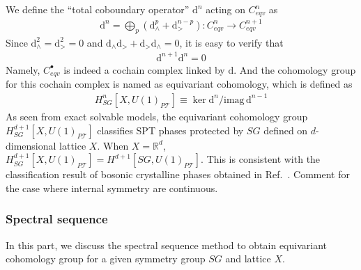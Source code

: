\documentclass[reprint,amsmath,amssymb,aps,pra,]{revtex4-1}
\newcommand{\dd}{\mathrm{d}} %
\newcommand{\TT}{\mathcal{T}} %
\newcommand{\imag}{\mathrm{imag}}
\begin{document}
We define the ``total coboundary operator'' $\dd^{n}$ acting on $C^{n}_{eqv}$ as
\begin{align}
  \dd^n=\bigoplus_p(\dd_\wedge^p+\dd_>^{n-p}):C^{n}_{eqv}\rightarrow C^{n+1}_{eqv}
  \label{}
\end{align}
Since $\dd_\wedge^2=\dd_>^2=0$ and $\dd_\wedge\dd_>+\dd_>\dd_\wedge=0$, it is easy to verify that
\begin{align}
  \dd^{n+1}\dd^n=0
  \label{}
\end{align}
Namely, $C^{\bullet}_{eqv}$ is indeed a cochain complex linked by $\dd$.
And the cohomology group for this cochain complex is named as equivariant cohomology, which is defined as
\begin{align}
  H^{n}_{SG}[X,U(1)_{P\TT}]\equiv\ker \dd^n/\imag\,\dd^{n-1}
  \label{}
\end{align}
As seen from exact solvable models, the equivariant cohomology group $H^{d+1}_{SG}[X,U(1)_{P\TT}]$ classifies SPT phases protected by $SG$ defined on $d$-dimensional lattice $X$.
When $X=\mathbb{R}^d$, $H^{d+1}_{SG}[X,U(1)_{P\TT}]=H^{d+1}[SG,U(1)_{P\TT}]$\cite{Brown2012cohomology}.
This is consistent with the classification result of bosonic crystalline phases obtained in Ref.~.
{\color{red} Comment for the case where internal symmetry are continuous.}

\subsubsection{Spectral sequence}
In this part, we discuss the spectral sequence method to obtain equivariant cohomology group for a given symmetry group $SG$ and lattice $X$.
\end{document}
